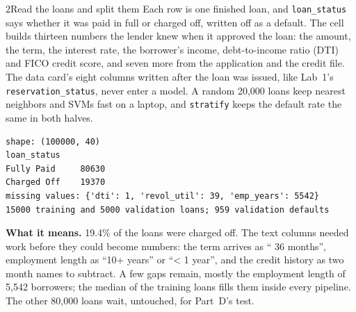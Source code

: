 
\begin{labquestion}{2}{Read the loans and split them}
Each row is one finished loan, and \texttt{loan\_status} says whether it was paid in full or charged off, written off as a default. The cell builds thirteen numbers the lender knew when it approved the loan: the amount, the term, the interest rate, the borrower's income, debt-to-income ratio (DTI) and FICO credit score, and seven more from the application and the credit file. The data card's eight columns written after the loan was issued, like Lab~1's \texttt{reservation\_status}, never enter a model. A random 20,000 loans keep nearest neighbors and SVMs fast on a laptop, and \texttt{stratify} keeps the default rate the same in both halves.
\end{labquestion}
\begin{labanswer}


\begin{refoutput}
\begin{lstlisting}[style=utpterminal]
shape: (100000, 40)
loan_status
Fully Paid     80630
Charged Off    19370
missing values: {'dti': 1, 'revol_util': 39, 'emp_years': 5542}
15000 training and 5000 validation loans; 959 validation defaults
\end{lstlisting}
\end{refoutput}

\textbf{What it means.} 19.4\% of the loans were charged off. The text columns needed work before they could become numbers: the term arrives as `` 36 months'', employment length as ``10+ years'' or ``< 1 year'', and the credit history as two month names to subtract. A few gaps remain, mostly the employment length of 5,542 borrowers; the median of the training loans fills them inside every pipeline. The other 80,000 loans wait, untouched, for Part~D's test.
\end{labanswer}

